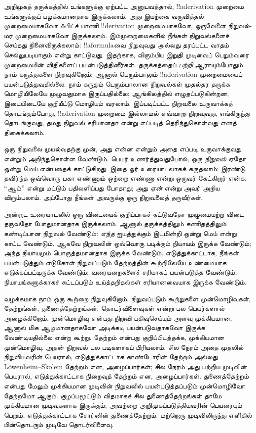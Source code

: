\documentclass[../../../include/open-logic-section]{subfiles}
\begin{document}


அறிமுகத் தருக்கத்தில் உங்களுக்கு ஏற்பட்ட அனுபவத்தால்,
!!a{derivation} முறைமை உங்களுக்குப் பழக்கமானதாக இருக்கலாம்.
அது இயற்கை வருவித்தல் முறைமையாகவோ ஃபிட்ச் பாணி
!!{derivation} முறைமையாகவோ, ஒருவேளை நிறுவல்-மர
முறைமையாகவோ இருக்கலாம். இம்முறைமைகளில் நீங்கள் நிறுவல்களைச்
செய்தது நினைவிருக்கலாம்: !!a{formula}வை நிறுவுவது அல்லது
தரப்பட்ட வாதம் செல்லுபடியாகும் என்று காட்டுவது. இதற்காக,
விரும்பிய இறுதி முடிவைப் பெறும்வரை முறைமையின் விதிகளைப்
பயன்படுத்தினீர்கள். தருக்கத்தைப் \emph{பற்றி} ஆராயும்போதும்
நாம் கருத்துகளை நிறுவுகிறோம்; ஆனால் பெரும்பாலும்
!!a{derivation} முறைமையைப் பயன்படுத்துவதில்லை. நாம் கருதும்
பெரும்பாலான நிறுவல்கள் முதல்தர தருக்க மொழியிலேயே முழுவதுமாக
இருப்பதில்லை; ஆங்கிலத்தில் எழுதப்படுகின்றன, இடையிடையே குறியீட்டு
மொழியும் வரலாம். இப்படிப்பட்ட நிறுவலை உருவாக்கத் தொடங்கும்போது,
!!a{derivation} முறைமை இல்லாமல் எவ்வாறு நிறுவுவது, எங்கிருந்து
தொடங்குவது, தமது நிறுவல் சரியானதா என்று எப்படித் தெரிந்துகொள்வது
எனத் திகைக்கலாம்.

ஒரு நிறுவலை முயல்வதற்கு முன், அது என்ன என்றும் அதை எப்படி
உருவாக்குவது என்றும் அறிந்துகொள்ள வேண்டும். பெயர் உணர்த்துவதுபோல்,
ஒரு \emph{நிறுவல்} ஏதோ ஒன்று மெய் என்பதைக் காட்டுகிறது. இதை
ஓர் உரையாடலாகக் கருதலாம்: இரண்டு தவிர்ந்த ஒவ்வொரு பகா எண்ணும்
ஒற்றை எண்ணா என்று ஒருவர் கேட்கிறார் என்க. ``ஆம்'' என்று மட்டும்
பதிலளிப்பது போதாது; அது \emph{ஏன்} என்று அவர் அறிய விரும்பலாம்.
அப்போது நீங்கள் அவருக்கு ஒரு நிறுவலைத் தருவீர்கள்.

அன்றாட உரையாடலில் ஒரு விடையைக் குறிப்பாகச் சுட்டுவதோ
முழுமையற்ற விடை தருவதோ போதுமானதாக இருக்கலாம். ஆனால்
தருக்கத்திலும் கணிதத்திலும் கண்டிப்பான நிறுவல் வேண்டும்:
\emph{எந்த} ஐயத்துக்கும் இடமின்றி ஒன்று மெய் என்று காட்ட
வேண்டும். ஆகவே நிறுவலின் ஒவ்வொரு படிக்கும் நியாயம் இருக்க
வேண்டும்; அந்த நியாயமும் பொருத்தமானதாக இருக்க வேண்டும்.
எடுத்துக்காட்டாக, நீங்கள் பயன்படுத்தும் எடுகோள் நிறுவப்படும்
தேற்றத்தின் கூற்றிலேயே உண்மையாக எடுக்கப்பட்டிருக்க வேண்டும்;
வரையறைகளைச் சரியாகப் பயன்படுத்த வேண்டும்; நியாயங்களுக்காகச்
சுட்டப்படும் உய்த்தறிதல்கள் சரியானவையாக இருக்க வேண்டும்.

வழக்கமாக நாம் ஒரு கூற்றை நிறுவுகிறோம். நிறுவப்படும் கூற்றுகளை
முன்மொழிவுகள், தேற்றங்கள், துணைத்தேற்றங்கள், தொடர்விளைவுகள்
என்று பல பெயர்களால் அழைக்கிறோம். முன்மொழிவு என்பது
நிறுவி பதிவுசெய்யும் அளவு முக்கியமான, ஆனால் மிக ஆழமானதாகவோ
அடிக்கடி பயன்படுவதாகவோ இருக்க வேண்டியதில்லை என்ற கூற்று.
தேற்றம் என்பது குறிப்பிடத்தக்க, முக்கியமான முன்மொழிவு. அதன்
நிறுவல் பல படிகளாகப் பிரியலாம். சில நேரம் அதை முதலில்
நிறுவியவரின் பெயரால், எடுத்துக்காட்டாக காண்டோரின் தேற்றம்
அல்லது L\"owenheim--Skolem தேற்றம் என, அழைப்பார்கள்;
சில நேரம் அது பற்றிய முடிவின் பெயரால், எடுத்துக்காட்டாக
நிறைவுத் தேற்றம் என, அழைப்பார்கள். துணைத்தேற்றம் என்பது
மேலும் முக்கியமான முடிவின் நிறுவலில் பயன்படுத்தப்படும்
முன்மொழிவோ தேற்றமோ ஆகும். குழப்பமூட்டும் விதமாகச் சில
துணைத்தேற்றங்கள் தாமே முக்கியமான முடிவுகளாக இருக்கும்;
அவற்றை அறிமுகப்படுத்தியவரின் பெயரையும் பெறும், எடுத்துக்காட்டாக
சோர்னின் துணைத்தேற்றம். மற்றொரு முடிவிலிருந்து எளிதில்
பின்தொடரும் முடிவே தொடர்விளைவு.
\end{document}
